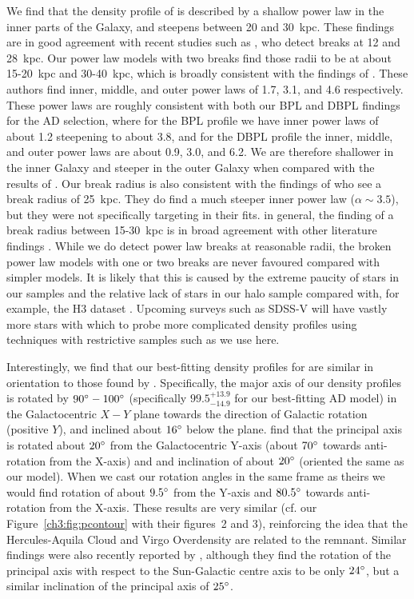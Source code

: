 We find that the density profile of \gse is described by a shallow power law in the inner parts of the Galaxy, and steepens between 20 and 30~kpc. These findings are in good agreement with recent studies such as \textcite{han22}, who detect breaks at 12 and 28~kpc. Our power law models with two breaks find those radii to be at about 15-20~kpc and 30-40~kpc, which is broadly consistent with the findings of \textcite{han22}. These authors find inner, middle, and outer power laws of 1.7, 3.1, and 4.6 respectively. These power laws are roughly consistent with both our BPL and DBPL findings for the AD selection, where for the BPL profile we have inner power laws of about 1.2 steepening to about 3.8, and for the DBPL profile the inner, middle, and outer power laws are about 0.9, 3.0, and 6.2. We are therefore shallower in the inner Galaxy and steeper in the outer Galaxy when compared with the results of \textcite{han22}. Our break radius is also consistent with the findings of \cite{mackereth20} who see a break radius of 25~kpc. They do find a much steeper inner power law ($\alpha \sim 3.5$), but they were not specifically targeting \gse in their fits. in general, the finding of a break radius between 15-30~kpc is in broad agreement with other literature findings \parencite{sesar11,deason11,xue15,deason19}. While we do detect power law breaks at reasonable radii, the broken power law models with one or two breaks are never favoured compared with simpler models. It is likely that this is caused by the extreme paucity of stars in our \gse samples and the relative lack of stars in our halo sample compared with, for example, the H3 dataset \parencite{h3}. Upcoming surveys such as SDSS-V \parencite{sdss5} will have vastly more stars with which to probe more complicated density profiles using techniques with restrictive samples such as we use here.

Interestingly, we find that our best-fitting density profiles for \gse are similar in orientation to those found by \textcite{iorio19}. Specifically, the major axis of our density profiles is rotated by $90\hbox{$^\circ$}-100\hbox{$^\circ$}$ (specifically $99.5^{+13.9}_{-14.9}$ for our best-fitting AD model) in the Galactocentric $X-Y$ plane towards the direction of Galactic rotation (positive $Y$), and inclined about $16\hbox{$^\circ$}$ below the plane. \textcite{iorio19} find that the principal axis is rotated about $20\hbox{$^\circ$}$ from the Galactocentric Y-axis (about $70\hbox{$^\circ$}$ towards anti-rotation from the X-axis) and and inclination of about $20\hbox{$^\circ$}$ (oriented the same as our model). When we cast our rotation angles in the same frame as theirs we would find rotation of about $9.5\hbox{$^\circ$}$ from the Y-axis and $80.5\hbox{$^\circ$}$ towards anti-rotation from the X-axis. These results are very similar (cf. our Figure~\ref{ch3:fig:pcontour} with their figures~2 and 3), reinforcing the idea that the Hercules-Aquila Cloud and Virgo Overdensity are related to the \gse remnant. Similar findings were also recently reported by \textcite{han22}, although they find the rotation of the principal axis with respect to the Sun-Galactic centre axis to be only $24\hbox{$^\circ$}$, but a similar inclination of the principal axis of $25\hbox{$^\circ$}$.

